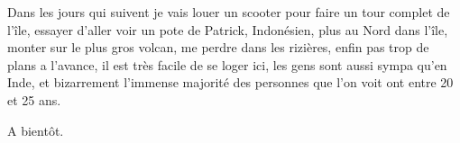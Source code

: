 \begin{multicols}{2}
Dans les jours qui suivent je vais louer un scooter pour faire un tour complet de l'île, essayer d'aller voir un pote de Patrick, Indonésien, plus au Nord dans l'île, monter sur le plus gros volcan, me perdre dans les rizières, enfin pas trop de plans a l'avance, il est très facile de se loger ici, les gens sont aussi sympa qu'en Inde, et bizarrement l'immense majorité des personnes que l'on voit ont entre 20 et 25 ans.

A bientôt.

\end{multicols}
